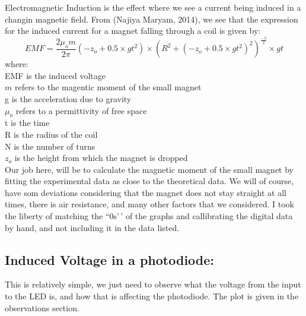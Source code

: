 \documentclass{../_layouts/ieeeconf}
\begin{document}
Electromagnetic Induction is the effect where we see a current being induced in a changin magnetic field. From (Najiya Maryam, 2014), we see that the expression for the induced current for a magnet falling through a coil is given by:
\[ EMF = \frac{2\mu_o m}{2\pi}(-z_o+0.5\times gt^2) \times (R^2+(-z_o+0.5\times gt^2)^2)^\frac{-5}{2}\times gt \]
where:\\
EMF is the induced voltage\\
\(m\) refers to the magentic moment of the small magnet\\
g is the acceleration due to gravity\\
\(\mu_o\) refers to a permittivity of free space\\
t is the time\\
R is the radius of the coil\\
N is the number of turns\\
\(z_o\) is the height from which the magnet is dropped\\
Our job here, will be to calculate the magnetic moment of the small magnet by fitting the experimental data as close to the theoretical data. We will of course, have som deviations considering that the magnet does not stay straight at all times, there is air resistance, and many other factors that we considered. I took the liberty of matching the ``0s'\,' of the graphs and callibrating the digital data by hand, and not including it in the data listed.

\subsection{Induced Voltage in a photodiode:}

This is relatively simple, we just need to observe what the voltage from the input to the LED is, and how that is affecting the photodiode. The plot is given in the observations section.
\end{document}
